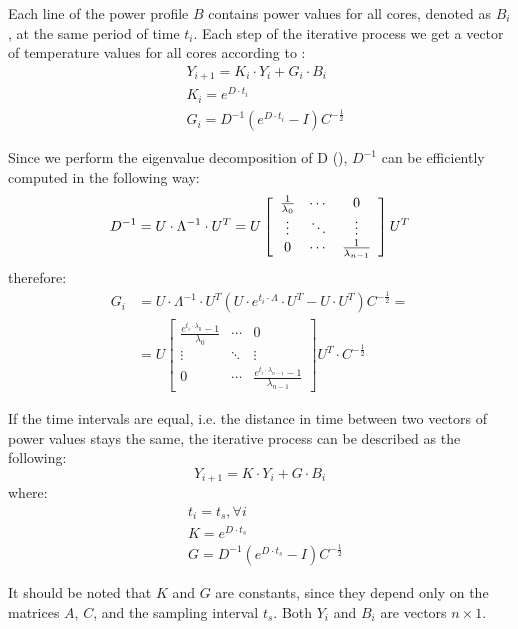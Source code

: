 Each line of the power profile $B$ contains power values for all cores, denoted as $B_i$, at the same period of time $t_i$. Each step of the iterative process we get a vector of temperature values for all cores according to :
\begin{align}
  & Y_{i+1} = K_i \cdot Y_i + G_i \cdot B_i \label{eq:ce-recurrent} \\
  & K_i = e^{D \cdot t_i} \nonumber \\
  & G_i = D^{-1}(e^{D \cdot t_i} - I) C^{-\frac{1}{2}} \nonumber
\end{align}

Since we perform the eigenvalue decomposition of D (), $D^{-1}$ can be efficiently computed in the following way:
\[
  D^{-1} = U \cdot \Lambda^{-1} \cdot U^T = U \left[
      \begin{array}{ccc}
        \frac{1}{\lambda_0} & \cdots & 0 \\
        \vdots & \ddots & \vdots \\
        0 & \cdots & \frac{1}{\lambda_{n - 1}}
      \end{array}
    \right] U^T \\
\]
therefore:
\begin{align*}
  G_i & = U \cdot \Lambda^{-1} \cdot U^T (U \cdot e^{t_i \cdot \Lambda} \cdot U^T - U \cdot U^T) C^{-\frac{1}{2}} = \\
      & = U \left[
        \begin{array}{ccc}
          \frac{e^{t_i \cdot \lambda_0} - 1}{\lambda_0} & \cdots & 0 \\
          \vdots & \ddots & \vdots \\
          0 & \cdots & \frac{e^{t_i \cdot \lambda_{n - 1}} - 1}{\lambda_{n - 1}}
        \end{array}
      \right] U^T \cdot C^{-\frac{1}{2}}
\end{align*}

If the time intervals are equal, i.e. the distance in time between two vectors of power values stays the same, the iterative process can be described as the following:
\[
  Y_{i+1} = K \cdot Y_i + G \cdot B_i
\]
where:
\begin{align*}
  & t_i = t_s, \forall i \\
  & K = e^{D \cdot t_s} \\
  & G = D^{-1}(e^{D \cdot t_s}-I) C^{-\frac{1}{2}}
\end{align*}

It should be noted that $K$ and $G$ are constants, since they depend only on the matrices $A$, $C$, and the sampling interval $t_s$.  Both $Y_i$ and $B_i$ are vectors $n \times 1$.

